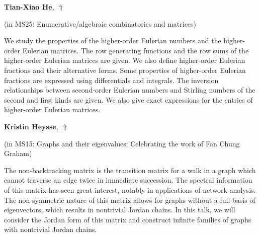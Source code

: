 \documentclass[ILAS2025-program.tex]{subfiles}
\begin{document}
     \hypertarget{down0183}{}\begin{ilasabstract}
    
    \textbf{Tian-Xiao He},  \hfill \hyperlink{up0183}{$\Uparrow$}
    
    (in {\color{mstitle}MS25: Enumerative/algebraic combinatorics and matrices})
        
        \mtskip
    We study the properties of the higher-order Eulerian numbers and the higher-order Eulerian matrices. The row generating functions and the row sums of the higher-order Eulerian matrices are given. We also define higher-order Eulerian fractions and their alternative forms. Some properties of higher-order Eulerian fractions are expressed using differentials and integrals. The inversion relationships between second-order Eulerian numbers and Stirling numbers of the second and first kinds are given. We also give exact expressions for the entries of higher-order Eulerian matrices.\end{ilasabstract}
     \hypertarget{down0062}{}\begin{ilasabstract}
    
    \textbf{Kristin Heysse},  \hfill \hyperlink{up0062}{$\Uparrow$}
    
    (in {\color{mstitle}MS15: Graphs and their eigenvalues: Celebrating the work of Fan Chung Graham})
        
        \mtskip
    The non-backtracking matrix is the transition matrix for a walk in a graph which cannot traverse an edge twice in immediate succession. The spectral information of this matrix has seen great interest, notably in applications of network analysis. The non-symmetric nature of this matrix allows for graphs without a full basis of eigenvectors, which results in nontrivial Jordan chains. In this talk, we will consider the Jordan form of this matrix and construct infinite families of graphs with nontrivial Jordan chains. 
\end{ilasabstract}
\end{document}
